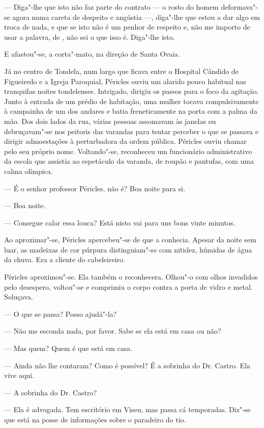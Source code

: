 --- Diga"-lhe que isto não faz parte do contrato --- o rosto do homem
  deformava"-se agora numa careta de despeito e angústia ---, diga"-lhe
  que estou a dar algo em troca de nada, e que se isto não é um penhor
  de respeito e, não me importo de usar a palavra, de , não sei o
  que isso é. Diga"-lhe isto.

E afastou"-se, a corta"-mato, na direção de Santa Ovaia.

Já no centro de Tondela, num largo que ficava entre o
Hospital Cândido de Figueiredo e a Igreja Paroquial, Péricles ouviu um
alarido pouco habitual nas tranquilas noites tondelenses. Intrigado,
dirigiu os passos para o foco da agitação. Junto à entrada de um prédio
de habitação, uma mulher tocava compulsivamente à campainha de um dos
andares e batia freneticamente na porta com a palma da mão. Dos dois
lados da rua, várias pessoas assomavam às janelas ou debruçavam"-se nos
peitoris das varandas para tentar perceber o que se passava e dirigir
admoestações à perturbadora da ordem pública. Péricles ouviu chamar
pelo seu próprio nome. Voltando"-se, reconheceu um funcionário
administrativo da escola que assistia ao espetáculo da varanda, de
roupão e pantufas, com uma calma olímpica.

--- É o senhor professor Péricles, não é? Boa noite para si.

--- Boa noite.

--- Consegue calar essa louca? Está nisto vai para uns bons vinte minutos.

Ao aproximar"-se, Péricles apercebeu"-se de que a conhecia. Apesar da
noite sem luar, as madeixas de cor púrpura distinguiam"-se
com nitidez, húmidas de água da chuva. Era a cliente do
cabeleireiro.

Péricles aproximou"-se. Ela também o reconhecera. Olhou"-o com olhos invadidos pelo desespero, voltou"-se e comprimiu o corpo
contra a porta de vidro e metal. Soluçava.

--- O que se passa? Posso ajudá"-la?

--- Não me esconda nada, por favor. Sabe se ela está em casa ou não?

--- Mas quem? Quem é que está em casa.

--- Ainda não lhe contaram? Como é possível? É a sobrinha do Dr. Castro.
  Ela vive aqui.

--- A sobrinha do Dr. Castro?

--- Ela é advogada. Tem escritório em Viseu, mas passa cá temporadas.
  Diz"-se que está na posse de informações sobre o paradeiro do tio.


